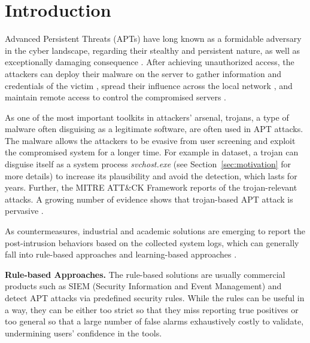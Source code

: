 \section{Introduction}
Advanced Persistent Threats (APTs) have long known as a formidable adversary in the cyber landscape,
regarding their stealthy and persistent nature, 
as well as exceptionally damaging consequence \cite{xx, xx, xx, xx, xx}.
After achieving unauthorized access, 
the attackers can deploy their malware on the server to 
gather information and credentials of the victim \cite{xx, xx},
spread their influence across the local network \cite{xx, xx}, and
maintain remote access to control the compromised servers \cite{xx, xx}.

As one of the most important toolkits in attackers' arsenal,
trojans, a type of malware often disguising as a legitimate software,  
are often used in APT attacks.
The malware allows the attackers to 
be evasive from user screening and
exploit the compromised system for a longer time.
For example in  dataset, 
a trojan can disguise itself as a system process \textit{svchost.exe} (see Section~\ref{sec:motivation} for more details)
to increase its plausibility and avoid the detection,
which lasts for  years.
Further, the MITRE ATT\&CK Framework reports  of the trojan-relevant attacks.
A growing number of evidence shows that trojan-based APT attack is 
pervasive \cite{valeros2020growth, xx}. 


As countermeasures, industrial and academic solutions \cite{karantzas2021empirical, cheng2023kairos,alsaheel2021atlas,han2020unicorn,inam2022sok,han2021sigl} are emerging to
report the post-intrusion behaviors based on the collected system logs,
which can generally fall into rule-based approaches \cite{milajerdi2019holmes,milajerdi2019poirot,hossain2020combating} and learning-based approaches \cite{liu2018towards,hassan2019nodoze,hassan2020we, wang2022threatrace,han2020unicorn,wang2020you}. 

\noindent\textbf{Rule-based Approaches.}
The rule-based solutions are usually commercial products \cite{milajerdi2019holmes,milajerdi2019poirot,hossain2020combating} such as SIEM (Security Information and Event Management) and  detect APT attacks via predefined security rules.
While the rules can be useful in a way,
they can be either too strict so that they miss reporting true positives or
too general so that a large number of false alarms exhaustively costly to validate,
undermining users' confidence in the tools.

